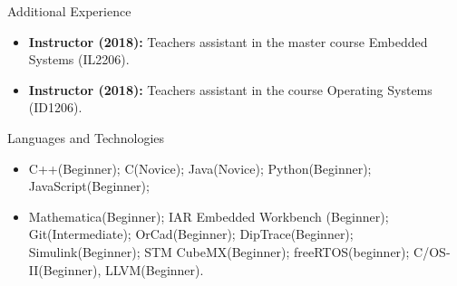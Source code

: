 \documentclass[]{mcdowellcv}
\begin{document}
\begin{cvsection}{Additional Experience}
    \begin{cvsubsection}{}{}{}	
        \begin{itemize}
            \item \textbf{Instructor (2018):} Teachers assistant in the master course Embedded Systems (IL2206).
            \item \textbf{Instructor (2018):} Teachers assistant in the course Operating Systems (ID1206).
        \end{itemize}
    \end{cvsubsection}
\end{cvsection}

\begin{cvsection}{Languages and Technologies}
    \begin{cvsubsection}{}{}{}	
        \begin{itemize}
            \item C++(Beginner); C(Novice); Java(Novice); Python(Beginner); JavaScript(Beginner); 
            \item Mathematica(Beginner); IAR Embedded Workbench (Beginner); Git(Intermediate);
                OrCad(Beginner); DipTrace(Beginner); Simulink(Beginner); STM CubeMX(Beginner);
                freeRTOS(beginner); \mu C/OS-II(Beginner), LLVM(Beginner).
        \end{itemize}
    \end{cvsubsection}
\end{cvsection}
\end{document}
